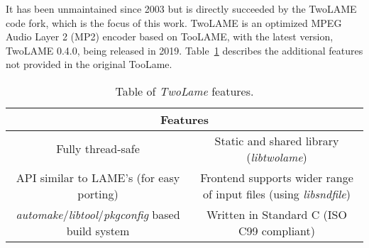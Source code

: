 It has been unmaintained since 2003 but is directly succeeded by the TwoLAME~\cite{twolame} code fork, which is the focus of this work.
TwoLAME is an optimized MPEG Audio Layer 2 (MP2) encoder based on TooLAME, with the latest version, TwoLAME 0.4.0, being released in 2019.
Table~\ref{tab:twolame} describes the additional features not provided in the original TooLame.

\begin{table}[h]
    \centering
    \begin{tabular}{|c|c|}
        \hline
        \multicolumn{2}{|c|}{\textbf{Features}} \\
        \hline
         Fully thread-safe & Static and shared library (\textit{libtwolame}) \\
         \hline
         API similar to LAME's (for easy porting) & Frontend supports wider range of input files (using \textit{libsndfile}) \\
         \hline
         \textit{automake}/\textit{libtool}/\textit{pkgconfig} based build system & Written in Standard C (ISO C99 compliant)\\
         \hline
    \end{tabular}
    \caption{Table of \textit{TwoLame} features.}
    \label{tab:twolame}
\end{table}
